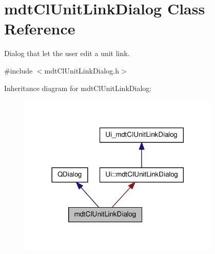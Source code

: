 \hypertarget{classmdt_cl_unit_link_dialog}{\section{mdt\-Cl\-Unit\-Link\-Dialog Class Reference}
\label{classmdt_cl_unit_link_dialog}
}


Dialog that let the user edit a unit link.  




{\ttfamily \#include $<$mdt\-Cl\-Unit\-Link\-Dialog.\-h$>$}



Inheritance diagram for mdt\-Cl\-Unit\-Link\-Dialog\-:\nopagebreak
\begin{figure}[H]
\begin{center}
\leavevmode
\includegraphics[width=272pt]{classmdt_cl_unit_link_dialog__inherit__graph}
\end{center}
\end{figure}


